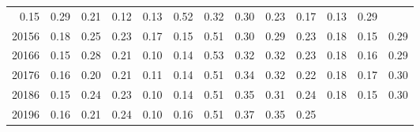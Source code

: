 \begin{table}[!h]
\begin{tabular}{lllllllllllll}
  \multicolumn{1}{|r}{0.15} &
  \multicolumn{1}{r}{0.29} &
  \multicolumn{1}{r}{0.21} &
  \multicolumn{1}{r}{0.12} &
  \multicolumn{1}{r}{0.13} &
  \multicolumn{1}{r}{0.52} &
  \multicolumn{1}{r}{0.32} &
  \multicolumn{1}{r}{0.30} &
  \multicolumn{1}{r}{0.23} &
  \multicolumn{1}{r}{0.17} &
  \multicolumn{1}{r}{0.13} &
  \multicolumn{1}{r}{0.29} \\
\multicolumn{1}{l}{\hspace{1em}20156} &
  \multicolumn{1}{|r}{0.18} &
  \multicolumn{1}{r}{0.25} &
  \multicolumn{1}{r}{0.23} &
  \multicolumn{1}{r}{0.17} &
  \multicolumn{1}{r}{0.15} &
  \multicolumn{1}{r}{0.51} &
  \multicolumn{1}{r}{0.30} &
  \multicolumn{1}{r}{0.29} &
  \multicolumn{1}{r}{0.23} &
  \multicolumn{1}{r}{0.18} &
  \multicolumn{1}{r}{0.15} &
  \multicolumn{1}{r}{0.29} \\
\multicolumn{1}{l}{\hspace{1em}20166} &
  \multicolumn{1}{|r}{0.15} &
  \multicolumn{1}{r}{0.28} &
  \multicolumn{1}{r}{0.21} &
  \multicolumn{1}{r}{0.10} &
  \multicolumn{1}{r}{0.14} &
  \multicolumn{1}{r}{0.53} &
  \multicolumn{1}{r}{0.32} &
  \multicolumn{1}{r}{0.32} &
  \multicolumn{1}{r}{0.23} &
  \multicolumn{1}{r}{0.18} &
  \multicolumn{1}{r}{0.16} &
  \multicolumn{1}{r}{0.29} \\
\multicolumn{1}{l}{\hspace{1em}20176} &
  \multicolumn{1}{|r}{0.16} &
  \multicolumn{1}{r}{0.20} &
  \multicolumn{1}{r}{0.21} &
  \multicolumn{1}{r}{0.11} &
  \multicolumn{1}{r}{0.14} &
  \multicolumn{1}{r}{0.51} &
  \multicolumn{1}{r}{0.34} &
  \multicolumn{1}{r}{0.32} &
  \multicolumn{1}{r}{0.22} &
  \multicolumn{1}{r}{0.18} &
  \multicolumn{1}{r}{0.17} &
  \multicolumn{1}{r}{0.30} \\
\multicolumn{1}{l}{\hspace{1em}20186} &
  \multicolumn{1}{|r}{0.15} &
  \multicolumn{1}{r}{0.24} &
  \multicolumn{1}{r}{0.23} &
  \multicolumn{1}{r}{0.10} &
  \multicolumn{1}{r}{0.14} &
  \multicolumn{1}{r}{0.51} &
  \multicolumn{1}{r}{0.35} &
  \multicolumn{1}{r}{0.31} &
  \multicolumn{1}{r}{0.24} &
  \multicolumn{1}{r}{0.18} &
  \multicolumn{1}{r}{0.15} &
  \multicolumn{1}{r}{0.30} \\
\multicolumn{1}{l}{\hspace{1em}20196} &
  \multicolumn{1}{|r}{0.16} &
  \multicolumn{1}{r}{0.21} &
  \multicolumn{1}{r}{0.24} &
  \multicolumn{1}{r}{0.10} &
  \multicolumn{1}{r}{0.16} &
  \multicolumn{1}{r}{0.51} &
  \multicolumn{1}{r}{0.37} &
  \multicolumn{1}{r}{0.35} &
  \multicolumn{1}{r}{0.25} &

\end{tabular}
\end{table}
